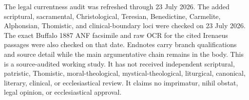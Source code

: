 The legal currentness audit was refreshed through 23 July 2026. The added scriptural, sacramental, Christological, Teresian, Benedictine, Carmelite, Alphonsian, Thomistic, and clinical-boundary loci were checked on 23 July 2026. The exact Buffalo 1887 ANF facsimile and raw OCR for the cited Irenaeus passages were also checked on that date. Endnotes carry branch qualifications and source detail while the main argumentative chain remains in the body. This is a source-audited working study. It has not received independent scriptural, patristic, Thomistic, moral-theological, mystical-theological, liturgical, canonical, literary, clinical, or ecclesiastical review. It claims no imprimatur, nihil obstat, legal opinion, or ecclesiastical approval.
